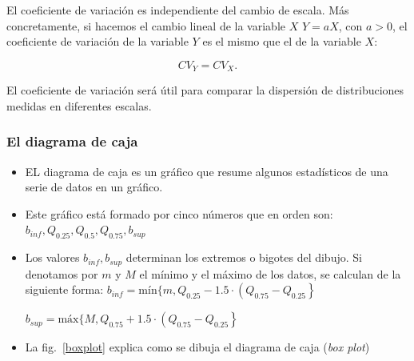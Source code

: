 % 
% 
% 
% 
% 

\begin{frame}
El coeficiente de variación  es independiente del cambio de escala. Más concretamente, si
hacemos el cambio lineal  de la variable $X$ $Y=a X$, con $a>0$,  el coeficiente de
variación  de la variable $Y$ es el mismo que el de la variable $X$:

$$CV_Y=CV_X.$$

El coeficiente de variación será útil para comparar la dispersión de distribuciones
medidas en diferentes escalas.


\end{frame}

\begin{frame}
\frametitle{El diagrama de caja}
\begin{itemize}
\item EL diagrama de caja es un gráfico que resume algunos estadísticos de una serie de datos en un gráfico.
\item Este gráfico está formado por cinco números que en orden son:
$b_{inf},Q_{0.25},Q_{0.5},Q_{0.75},b_{sup}$
\item Los valores $b_{inf},b_{sup}$ determinan los extremos o bigotes del dibujo. Si denotamos por $m$ y $M$ el mínimo y el máximo de los datos, se calculan de la siguiente forma:
$b_{inf}=\mbox{mín}\{m, Q_{0.25}-1.5\cdot\left(Q_{0.75}-Q_{0.25}\right\}$

$b_{sup}=\mbox{máx}\{M, Q_{0.75}+1.5\cdot\left(Q_{0.75}-Q_{0.25}\right\}$
\item La fig.~\ref{boxplot} explica como se dibuja el diagrama de caja (\textsl{box plot})
\end{itemize}
\end{frame}

